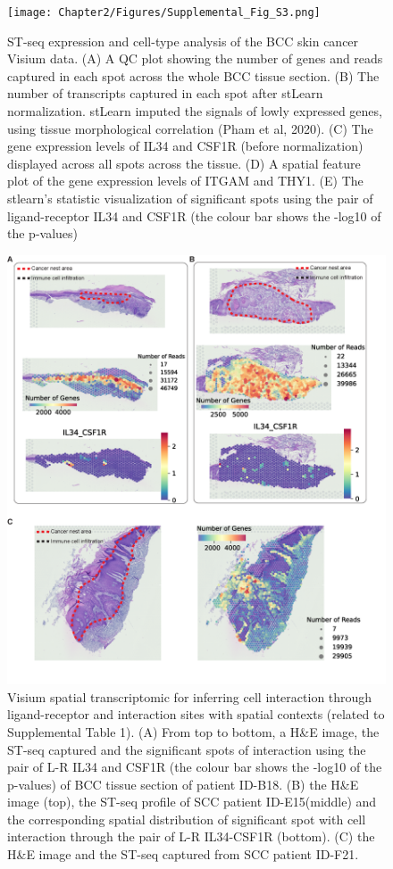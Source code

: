 \begin{figure}[htp]
\renewcommand{\figurename}{Supplementary Figure}
    \centering
    \texttt{[image: Chapter2/Figures/Supplemental\_Fig\_S3.png]}
    \caption[ST-seq expression and cell-type analysis of the BCC skin cancer Visium data.]{ST-seq expression and cell-type analysis of the BCC skin cancer Visium data. (A) A QC plot showing the number of genes and reads captured in each spot across the whole BCC tissue section. (B) The number of transcripts captured in each spot after stLearn normalization. stLearn imputed the signals of lowly expressed genes, using tissue morphological correlation (Pham et al, 2020). (C) The gene expression levels of IL34 and CSF1R (before normalization) displayed across all spots across the tissue. (D) A spatial feature plot of the gene expression levels of ITGAM and THY1. (E) The stlearn’s statistic visualization of significant spots using the pair of ligand-receptor IL34 and CSF1R (the colour bar shows the -log10 of the p-values)}
    \label{fig:Chap2_Supfigure3}
\end{figure}
\begin{figure}[htp]
\renewcommand{\figurename}{Supplementary Figure}
    \centering
    \includegraphics[width=0.75\columnwidth]{Chapter2/Figures/Supplemental_Fig_S4.png}
    \caption[Visium spatial transcriptomic for inferring cell interaction through ligand-receptor and interaction sites with spatial contexts]{Visium spatial transcriptomic for inferring cell interaction through ligand-receptor and interaction sites with spatial contexts (related to Supplemental Table 1). (A) From top to bottom, a H\&E image, the ST-seq captured and the significant spots of interaction using the pair of L-R IL34 and CSF1R (the colour bar shows the -log10 of the p-values) of BCC tissue section of patient ID-B18. (B) the H\&E image (top), the ST-seq profile of SCC patient ID-E15(middle) and the corresponding spatial distribution of significant spot with cell interaction through the pair of L-R IL34-CSF1R (bottom). (C) the H\&E image and the ST-seq captured from SCC patient ID-F21. }
    \label{fig:Chap2_Supfigure4}
\end{figure}

